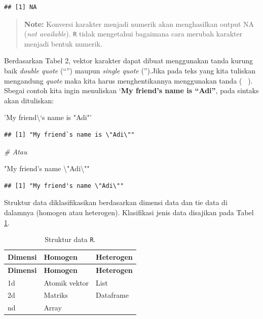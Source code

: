 \documentclass[]{book}
\newenvironment{Shaded}{\begin{snugshade}}{\end{snugshade}}
\newcommand{\CharTok}[1]{\textcolor[rgb]{0.31,0.60,0.02}{#1}}
\newcommand{\StringTok}[1]{\textcolor[rgb]{0.31,0.60,0.02}{#1}}
\newcommand{\CommentTok}[1]{\textcolor[rgb]{0.56,0.35,0.01}{\textit{#1}}}
\begin{document}
\begin{verbatim}
## [1] NA
\end{verbatim}

\begin{quote}
\textbf{Note: } Konversi karakter menjadi numerik akan menghasilkan
output NA (\emph{not available}). \texttt{R} tidak mengetahui bagaimana
cara merubah karakter menjadi bentuk numerik.
\end{quote}

Berdasarkan Tabel 2, vektor karakter dapat dibuat menggunakan tanda
kurung baik \emph{double quote} (``'') maupun \emph{single quote}
('').Jika pada teks yang kita tuliskan mengandung \emph{quote} maka kita
harus menghentikannya menggunakan tanda ( ~). Sbegai contoh kita ingin
menuliskan `\textbf{My friend's name is ``Adi''}, pada sintaks akan
dituliskan:

\begin{Shaded}
\begin{Highlighting}[]
\StringTok{'My friend\textbackslash{}`s name is "Adi"'}
\end{Highlighting}
\end{Shaded}

\begin{verbatim}
## [1] "My friend`s name is \"Adi\""
\end{verbatim}

\begin{Shaded}
\begin{Highlighting}[]
\CommentTok{# Atau}

\StringTok{"My friend's name }\CharTok{\textbackslash{}"}\StringTok{Adi}\CharTok{\textbackslash{}"}\StringTok{"}
\end{Highlighting}
\end{Shaded}

\begin{verbatim}
## [1] "My friend's name \"Adi\""
\end{verbatim}

Struktur data diklasifikasikan berdasarkan dimensi data dan tie data di
dalamnya (homogen atau heterogen). Klasifikasi jenis data disajikan pada
Tabel \ref{tab:strukturdata}.

\begin{longtable}[]{@{}lll@{}}
\caption{\label{tab:strukturdata} Struktur data \texttt{R}.}\tabularnewline
\toprule
\textbf{Dimensi} & \textbf{Homogen} & \textbf{Heterogen}\tabularnewline
\midrule
\endfirsthead
\toprule
\textbf{Dimensi} & \textbf{Homogen} & \textbf{Heterogen}\tabularnewline
\midrule
\endhead
1d & Atomik vektor & List\tabularnewline
2d & Matriks & Dataframe\tabularnewline
nd & Array &\tabularnewline
\bottomrule
\end{longtable}
\end{document}

